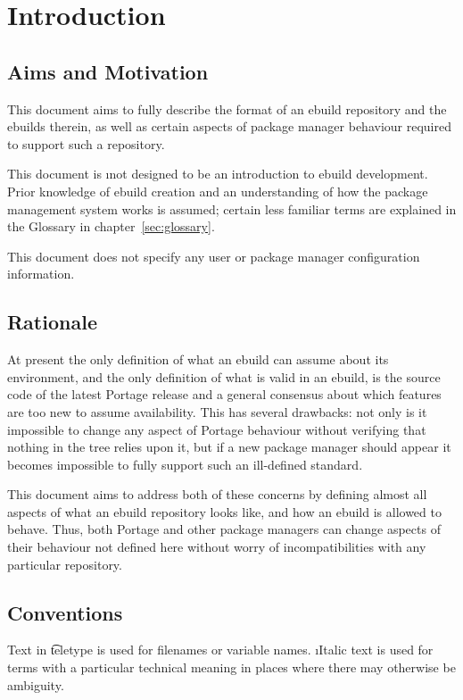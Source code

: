 \chapter{Introduction}

\section{Aims and Motivation}

This document aims to fully describe the format of an ebuild repository and the ebuilds therein, as
well as certain aspects of package manager behaviour required to support such a repository.

This document is \i{not} designed to be an introduction to ebuild development. Prior knowledge of
ebuild creation and an understanding of how the package management system works is assumed; certain
less familiar terms are explained in the Glossary in chapter~\ref{sec:glossary}.

This document does not specify any user or package manager configuration information.

\section{Rationale}

At present the only definition of what an ebuild can assume about its environment,
and the only definition of what is valid in an ebuild, is the source code of the latest Portage release
and a general consensus about which features are too new to assume availability. This has several
drawbacks: not only is it impossible to change any aspect of Portage behaviour without verifying
that nothing in the tree relies upon it, but if a new package manager should appear it becomes
impossible to fully support such an ill-defined standard.

This document aims to address both of these concerns by defining almost all aspects of what an
ebuild repository looks like, and how an ebuild is allowed to behave. Thus, both Portage and other
package managers can change aspects of their behaviour not defined here without worry of
incompatibilities with any particular repository.

\section{Conventions}

Text in \t{teletype} is used for filenames or variable names. \i{Italic} text is used for terms
with a particular technical meaning in places where there may otherwise be ambiguity.

